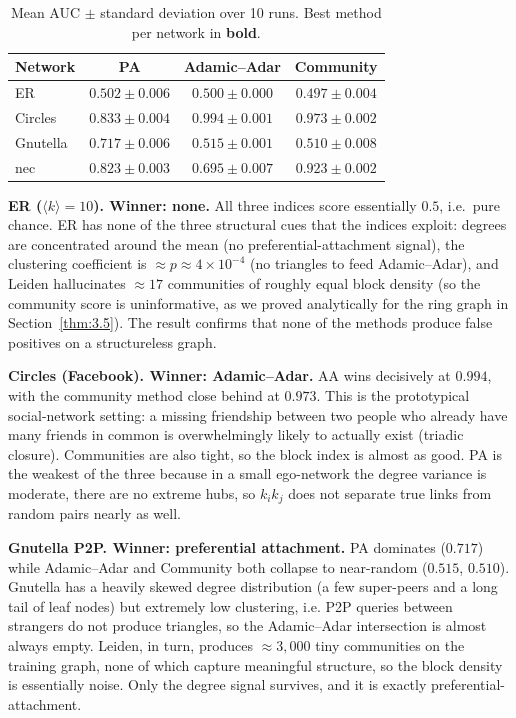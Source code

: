 \documentclass[12pt]{article}
\theoremstyle{definition}
\begin{document}
\begin{table}[h]
\centering
\caption{Mean AUC $\pm$ standard deviation over 10 runs. Best method per network in \textbf{bold}.}
\label{tab:lp-auc}
\begin{tabular}{@{}lccc@{}}
\toprule
Network   & PA               & Adamic--Adar     & Community \\
\midrule
ER        & $0.502 \pm 0.006$ & $0.500 \pm 0.000$ & $0.497 \pm 0.004$ \\
Circles   & $0.833 \pm 0.004$ & $\mathbf{0.994 \pm 0.001}$ & $0.973 \pm 0.002$ \\
Gnutella  & $\mathbf{0.717 \pm 0.006}$ & $0.515 \pm 0.001$ & $0.510 \pm 0.008$ \\
nec       & $0.823 \pm 0.003$ & $0.695 \pm 0.007$ & $\mathbf{0.923 \pm 0.002}$ \\
\bottomrule
\end{tabular}
\end{table}

\textbf{ER ($\langle k\rangle = 10$). Winner: none.} All three indices score essentially $0.5$, i.e.\ pure chance. ER has none of the three structural cues that the indices exploit: degrees are concentrated around the mean (no preferential-attachment signal), the clustering coefficient is $\approx p \approx 4\!\times\!10^{-4}$ (no triangles to feed Adamic--Adar), and Leiden hallucinates $\approx 17$ communities of roughly equal block density (so the community score is uninformative, as we proved analytically for the ring graph in Section~\ref{thm:3.5}). The result confirms that none of the methods produce false positives on a structureless graph.

\textbf{Circles (Facebook). Winner: Adamic--Adar.} AA wins decisively at $0.994$, with the community method close behind at $0.973$. This is the prototypical social-network setting: a missing friendship between two people who already have many friends in common is overwhelmingly likely to actually exist (triadic closure). Communities are also tight, so the block index is almost as good. PA is the weakest of the three because in a small ego-network the degree variance is moderate, there are no extreme hubs, so $k_i k_j$ does not separate true links from random pairs nearly as well.

\textbf{Gnutella P2P. Winner: preferential attachment.} PA dominates ($0.717$) while Adamic--Adar and Community both collapse to near-random ($0.515$, $0.510$). Gnutella has a heavily skewed degree distribution (a few super-peers and a long tail of leaf nodes) but extremely low clustering, i.e. P2P queries between strangers do not produce triangles, so the Adamic--Adar intersection is almost always empty. Leiden, in turn, produces $\approx 3{,}000$ tiny communities on the training graph, none of which capture meaningful structure, so the block density is essentially noise. Only the degree signal survives, and it is exactly preferential-attachment.
\end{document}
